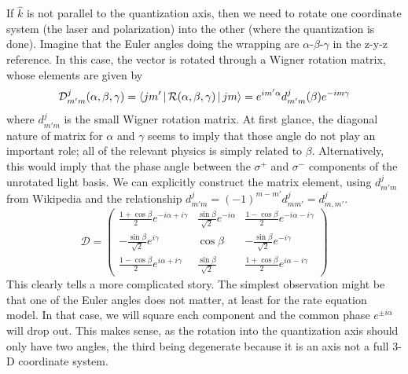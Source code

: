 \documentclass[final,5p,times,twocolumn]{elsarticle}
\begin{document}
If $\hat{k}$ is not parallel to the quantization axis, then we need to rotate
one coordinate system (the laser and polarization) into the other (where the
quantization is done).  Imagine that the Euler angles doing the wrapping are
$\alpha$-$\beta$-$\gamma$ in the z-y-z reference.  In this case, the vector is
rotated through a Wigner rotation matrix, whose elements are given by
\begin{equation}
  \mathcal{D}^j_{m'm}(\alpha,\beta,\gamma)
    = \Braket{jm'|\mathcal{R}(\alpha,\beta,\gamma)|jm}
    = e^{i m'\alpha} d^j_{m' m}(\beta)e^{-im\gamma}
\end{equation}
where $d^j_{m'm}$ is the small Wigner rotation matrix.  At first glance, the
diagonal nature of matrix for $\alpha$ and $\gamma$ seems to imply that those
angle do not play an important role; all of the relevant physics is simply
related to $\beta$.  Alternatively, this would imply that the phase angle
between the $\sigma^+$ and $\sigma^-$ components of the unrotated light basis.
We can explicitly construct the matrix element, using $d^j_{m'm}$ from Wikipedia
and the relationship $d^j_{m'm} = (-1)^{m-m'}d^j_{mm'} = d^j_{m,m'}$.
\begin{equation}
  \mathcal{D} = \left(\begin{array}{ccc}
  \frac{1+\cos\beta}{2}e^{-i\alpha+i\gamma} & \frac{\sin\beta}{\sqrt{2}}e^{-i\alpha} & \frac{1-\cos\beta}{2}e^{-i\alpha-i\gamma} \\
  -\frac{\sin\beta}{\sqrt{2}}e^{i\gamma} & \cos\beta & -\frac{\sin\beta}{\sqrt{2}}e^{-i\gamma} \\
  \frac{1-\cos\beta}{2}e^{i\alpha+i\gamma} & \frac{\sin\beta}{\sqrt{2}} & \frac{1+\cos\beta}{2}e^{i\alpha-i\gamma}
  \end{array}\right)
\end{equation}
This clearly tells a more complicated story.  The simplest observation might  be
that one of the Euler angles does not matter, at least for the rate equation
model.  In that case, we will square each component and the common phase $e^{\pm
i \alpha}$ will drop out.  This makes sense, as the rotation into the quantization
axis should only have two angles, the third being degenerate because it is an
axis not a full 3-D coordinate system.
\end{document}
